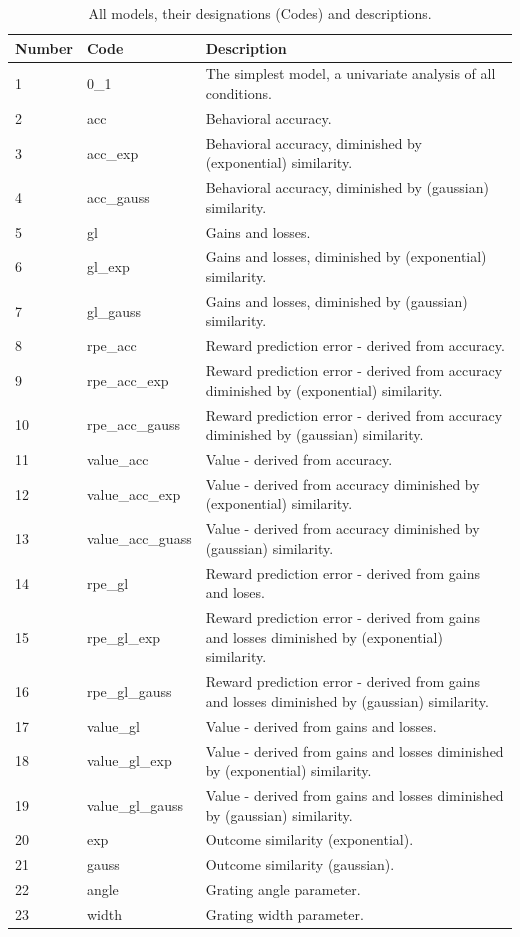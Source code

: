 \documentclass[doc,12pt]{apa}        %
\begin{document}
\begin{center}
    \begin{longtable}{ | l | l | p{8cm} |}
    \caption{All models, their designations (Codes) and descriptions.}\\
    \hline
    Number & Code & Description \\ \hline
    1 & 0\_1 & The simplest model, a univariate analysis of all conditions. \\ \hline
    2 & acc & Behavioral accuracy. \\ \hline
    3 & acc\_exp & Behavioral accuracy, diminished by (exponential) similarity. \\ \hline
    4 & acc\_gauss & Behavioral accuracy, diminished by (gaussian) similarity. \\ \hline
    5 & gl & Gains and losses. \\ \hline 
    6 & gl\_exp & Gains and losses, diminished by (exponential) similarity. \\ \hline
    7 & gl\_gauss & Gains and losses, diminished by (gaussian) similarity. \\ \hline
    8 & rpe\_acc & Reward prediction error - derived from accuracy. \\ \hline
    9 & rpe\_acc\_exp & Reward prediction error - derived from accuracy diminished by (exponential) similarity. \\ \hline
    10 & rpe\_acc\_gauss & Reward prediction error - derived from accuracy diminished by (gaussian) similarity. \\ \hline
    11 & value\_acc & Value - derived from accuracy. \\ \hline
    12 & value\_acc\_exp & Value - derived from accuracy diminished by (exponential) similarity. \\ \hline
    13 & value\_acc\_guass & Value - derived from accuracy diminished by (gaussian) similarity. \\ \hline
    14 & rpe\_gl & Reward prediction error - derived from gains and loses. \\ \hline
    15 & rpe\_gl\_exp & Reward prediction error - derived from gains and losses diminished by (exponential) similarity. \\ \hline
    16 & rpe\_gl\_gauss & Reward prediction error - derived from gains and losses diminished by (gaussian) similarity. \\ \hline
    17 & value\_gl & Value - derived from gains and losses. \\ \hline
    18 & value\_gl\_exp & Value - derived from gains and losses diminished by (exponential) similarity. \\ \hline
    19 & value\_gl\_gauss & Value - derived from gains and losses diminished by (gaussian) similarity. \\ \hline 
    20 & exp & Outcome similarity (exponential). \\ \hline
    21 & gauss & Outcome similarity (gaussian). \\ \hline
    22 & angle & Grating angle parameter. \\ \hline
    23 &width & Grating width parameter. \\ \hline
    \end{longtable}
\end{center}
\end{document}
